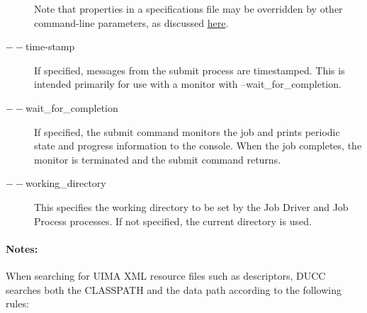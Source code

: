 \begin{description}
             Note that properties in a specifications file may be overridden by other command-line
             parameters, as discussed \hyperref[chap:cli]{here}.

           \item[$--$time-stamp ]

             If specified, messages from the submit process are timestamped. This is intended primarily 
             for use with a monitor with --wait\_for\_completion. 

           \item[$--$wait\_for\_completion ]             
             If specified, the submit command monitors the job and prints periodic
             state and progress information to the console.  When the job completes, the monitor
             is terminated and the submit command returns.
             
           \item[$--$working\_directory ]             
             This specifies the working directory to be set by the Job Driver and Job Process processes. 
             If not specified, the current directory is used.
  \end{description}
             
  \paragraph{Notes:}
  \label{par:cli.submit.notes}
  When searching for UIMA XML resource files such as descriptors, DUCC searches both the 
  CLASSPATH and the data path according to the following rules: 
  
